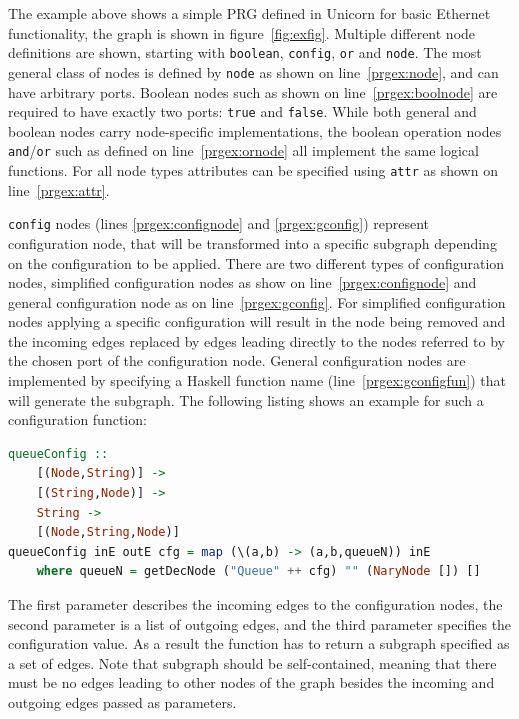 \documentclass[a4paper]{article}
\begin{document}
The example above shows a simple PRG defined in Unicorn for basic Ethernet
functionality, the graph is shown in figure~\ref{fig:exfig}. Multiple different
node definitions are shown, starting with \texttt{boolean}, \texttt{config},
\texttt{or} and \texttt{node}. The most general class of nodes is defined by
\texttt{node} as shown on line~\ref{prgex:node}, and can have arbitrary ports.
Boolean nodes such as shown on line~\ref{prgex:boolnode} are required to have
exactly two ports: \texttt{true} and \texttt{false}. While both general and
boolean nodes carry node-specific implementations, the boolean operation nodes
\texttt{and}/\texttt{or} such as defined on line~\ref{prgex:ornode} all
implement the same logical functions. For all node types attributes can be
specified using \texttt{attr} as shown on line~\ref{prgex:attr}.


\texttt{config} nodes (lines \ref{prgex:confignode} and \ref{prgex:gconfig})
represent configuration node, that will be transformed into a specific subgraph
depending on the configuration to be applied. There are two different types of
configuration nodes, simplified configuration nodes as show on
line~\ref{prgex:confignode} and general configuration node as on
line~\ref{prgex:gconfig}. For simplified configuration nodes applying a specific
configuration will result in the node being removed and the incoming edges
replaced by edges leading directly to the nodes referred to by the chosen port
of the configuration node. General configuration nodes are implemented by
specifying a Haskell function name (line~\ref{prgex:gconfigfun}) that will
generate the subgraph. The following listing shows an example for such a
configuration function:

\begin{lstlisting}[language=haskell]
queueConfig ::
    [(Node,String)] ->
    [(String,Node)] ->
    String ->
    [(Node,String,Node)]
queueConfig inE outE cfg = map (\(a,b) -> (a,b,queueN)) inE
    where queueN = getDecNode ("Queue" ++ cfg) "" (NaryNode []) []
\end{lstlisting}

The first parameter describes the incoming edges to the configuration nodes, the
second parameter is a list of outgoing edges, and the third parameter specifies
the configuration value. As a result the function has to return a subgraph
specified as a set of edges. Note that subgraph should be self-contained,
meaning that there must be no edges leading to other nodes of the graph besides
the incoming and outgoing edges passed as parameters.
\end{document}
